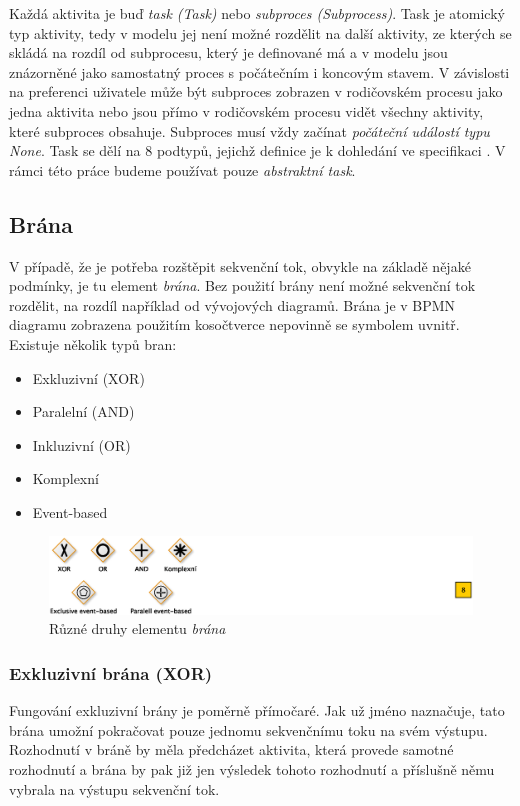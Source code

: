 Každá aktivita je buď \textit{task (Task)} nebo \textit{subproces (Subprocess)}. Task je atomický typ aktivity, tedy v modelu jej není možné rozdělit na další aktivity, ze kterých se skládá na rozdíl od subprocesu, který je definované má a v modelu jsou znázorněné jako samostatný proces s počátečním i koncovým stavem. V závislosti na preferenci uživatele může být subproces zobrazen v rodičovském procesu jako jedna  aktivita nebo jsou přímo v rodičovském procesu vidět všechny aktivity, které subproces obsahuje. Subproces musí vždy začínat \textit{počáteční událostí typu None}. Task se dělí na 8 podtypů, jejichž definice je k dohledání ve specifikaci \cite{Omg2011}. V rámci této práce budeme používat pouze \textit{abstraktní task}.

\subsection{Brána}
V případě, že je potřeba rozštěpit sekvenční tok, obvykle na základě nějaké podmínky, je tu element \textit{brána}. Bez použití brány není možné sekvenční tok rozdělit, na rozdíl například od vývojových diagramů. Brána je v BPMN diagramu zobrazena použitím kosočtverce nepovinně se symbolem uvnitř. Existuje několik typů bran:

\begin{itemize}
\item Exkluzivní (XOR)
\item Paralelní (AND)
\item Inkluzivní (OR)
\item Komplexní
\item Event-based
\end{itemize}

\begin{figure}[htbp]\centering
\includegraphics{obrazky/gateway-types}
\caption{Různé druhy elementu \textit{brána}}
\label{fig:brany}
\end{figure}

\subsubsection{Exkluzivní brána (XOR)}
Fungování exkluzivní brány je poměrně přímočaré. Jak už jméno naznačuje, tato brána umožní pokračovat pouze jednomu sekvenčnímu toku na svém výstupu. Rozhodnutí v bráně by měla předcházet aktivita, která provede samotné rozhodnutí a brána by pak již jen  výsledek tohoto rozhodnutí a příslušně němu vybrala na výstupu sekvenční tok.

